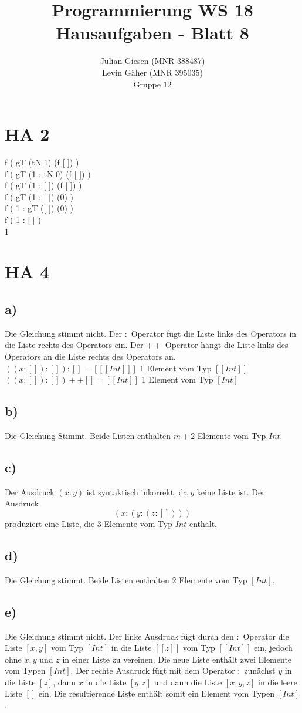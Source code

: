 \documentclass[a4paper]{article}
\title{ Programmierung WS 18 \\ Hausaufgaben - Blatt 8 }
\author{ Julian Giesen (MNR 388487) \\
Levin Gäher (MNR 395035) \\
Gruppe 12 }
\date{  }
\begin{document}
\maketitle
\section*{HA 2 }

f ( gT (tN 1) (f [ ]) )\\
f ( gT (1 : tN 0) (f [ ]) ) \\
f ( gT (1 : [ ]) (f [ ]) ) \\
f ( gT (1 : [ ]) (0) ) \\
f ( 1 : gT ([ ]) (0) ) \\
f ( 1 : [ ] ) \\
1 \\


\section*{HA 4}
\subsection*{a)}
Die Gleichung stimmt nicht. Der $:$ Operator fügt die Liste links des Operators in die Liste rechts des Operators ein. Der $++$ Operator hängt die Liste links des Operators an die Liste rechts des Operators an.\\
$((x:[]) : []) : [] = [[[Int]]]$ 1 Element vom Typ $[[Int]]$\\
$((x : []) : []) ++ [] = [[Int]]$ 1 Element vom Typ $[Int]$
\subsection*{b)}
Die Gleichung Stimmt. Beide Listen enthalten $m+2$ Elemente vom Typ $Int$. 
\subsection*{c)}
Der Ausdruck $(x : y)$ ist syntaktisch inkorrekt, da $y$ keine Liste ist. Der Ausdruck $$(x : (y : (z : [])))$$ produziert eine Liste, die 3 Elemente vom Typ $Int$ enthält.
\subsection*{d)}
Die Gleichung stimmt. Beide Listen enthalten 2 Elemente vom Typ $[Int]$.
\subsection*{e)}
Die Gleichung stimmt nicht. Der linke Ausdruck fügt durch den $:$ Operator die Liste $[x,y]$ vom Typ $[Int]$ in die Liste $[[z]]$ vom Typ $[[Int]]$ ein, jedoch ohne $x,y$ und $z$ in einer Liste zu vereinen. Die neue Liste enthält zwei Elemente vom Typen $[Int]$. Der rechte Ausdruck fügt mit dem Operator $:$ zunächst $y$ in die Liste $[z]$, dann $x$ in die Liste $[y,z]$ und dann die Liste $[x,y,z]$ in die leere Liste $[]$ ein. Die resultierende Liste enthält somit ein Element vom Typen $[Int]$.
\end{document}
